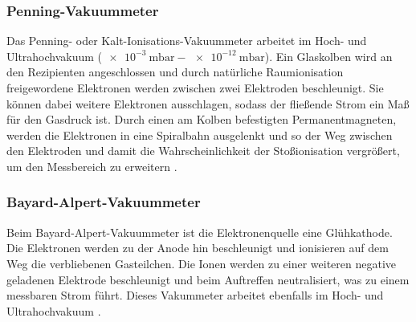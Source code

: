 \subsubsection{Penning-Vakuummeter}

Das Penning- oder Kalt-Ionisations-Vakuummeter arbeitet im Hoch- und Ultrahochvakuum ($\SI{e-3}{\milli\bar} - \SI{e-12}{\milli\bar}$). Ein Glaskolben wird an den Rezipienten angeschlossen und durch natürliche Raumionisation freigewordene Elektronen werden zwischen zwei Elektroden beschleunigt. Sie können dabei weitere Elektronen ausschlagen, sodass der fließende Strom ein Maß für den Gasdruck ist. Durch einen am Kolben befestigten Permanentmagneten, werden die Elektronen in eine Spiralbahn ausgelenkt und so der Weg zwischen den Elektroden  und damit die Wahrscheinlichkeit der Stoßionisation vergrößert, um den Messbereich zu erweitern \cite{Jena}.

\subsubsection{Bayard-Alpert-Vakuummeter}

Beim Bayard-Alpert-Vakuummeter ist die Elektronenquelle eine Glühkathode. Die Elektronen werden zu der Anode hin beschleunigt und ionisieren auf dem Weg die verbliebenen Gasteilchen. Die Ionen werden zu einer weiteren negative geladenen Elektrode beschleunigt und beim Auftreffen neutralisiert, was zu einem messbaren Strom führt. Dieses Vakummeter arbeitet ebenfalls im Hoch- und Ultrahochvakuum \cite{Spektrum}.
